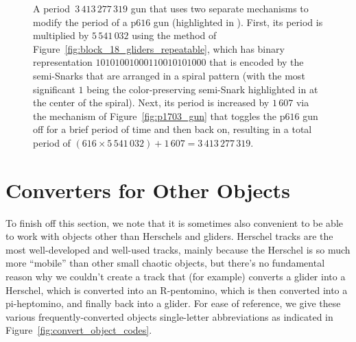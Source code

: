 \begin{figure}[!htb]
	\centering
	\caption{A period~$3\, 413\, 277\, 319$ gun that uses two separate mechanisms to modify the period of a p$616$ gun (highlighted in ). First, its period is multiplied by $5\, 541\, 032$ using the method of Figure~\ref{fig:block_18_gliders_repeatable}, which has binary representation $10101001000110010101000$ that is encoded by the semi-Snarks that are arranged in a spiral pattern (with the most significant $1$ being the color-preserving semi-Snark highlighted in  at the center of the spiral). Next, its period is increased by $1\, 607$ via the mechanism of Figure~\ref{fig:p1703_gun} that toggles the p$616$ gun off for a brief period of time and then back on, resulting in a total period of $(616 \times 5\, 541\, 032) + 1\, 607 = 3\, 413\, 277\, 319$.}
	\label{fig:p3413277319_gun}
\end{figure}


\section{Converters for Other Objects}\label{sec:misc_converters}

To finish off this section, we note that it is sometimes also convenient to be able to work with objects other than Herschels and gliders. Herschel tracks are the most well-developed and well-used tracks, mainly because the Herschel is so much more ``mobile'' than other small chaotic objects, but there's no fundamental reason why we couldn't create a track that (for example) converts a glider into a Herschel, which is converted into an R-pentomino, which is then converted into a pi-heptomino, and finally back into a glider. For ease of reference, we give these various frequently-converted objects single-letter abbreviations as indicated in Figure~\ref{fig:convert_object_codes}.

